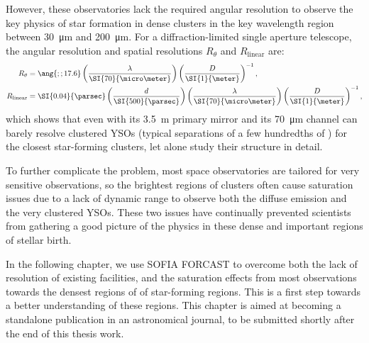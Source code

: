 However, these observatories lack the required angular resolution to observe the key physics of star formation in dense clusters in the key wavelength region between \SI{30}{\micro\meter} and \SI{200}{\micro\meter}. For a diffraction-limited single aperture telescope, the angular resolution and spatial resolutions $R_\theta$ and $R_\textrm{linear}$ are:
\begin{align}
R_\theta &= \ang{;;17.6}\left(\frac{\lambda}{\SI{70}{\micro\meter}}\right)\left(\frac{D}{\SI{1}{\meter}}\right)^{-1}, \\
R_\textrm{linear} &= \SI{0.04}{\parsec}\left(\frac{d}{\SI{500}{\parsec}}\right)\left(\frac{\lambda}{\SI{70}{\micro\meter}}\right)\left(\frac{D}{\SI{1}{\meter}}\right)^{-1},
\end{align}
which shows that even \Herschel with its \SI{3.5}{\meter} primary mirror and its \SI{70}{\micro\meter} channel can barely resolve clustered YSOs (typical separations of a few hundredths of \si{\parsec}) for the closest star-forming clusters, let alone study their structure in detail. 

To further complicate the problem, most space observatories are tailored for very sensitive observations, so the brightest regions of clusters often cause saturation issues due to a lack of dynamic range to observe both the diffuse emission and the very clustered YSOs. These two issues have continually prevented scientists from gathering a good picture of the physics in these dense and important regions of stellar birth.

In the following chapter, we use SOFIA FORCAST to overcome both the lack of resolution of existing facilities, and the saturation effects from most observations towards the densest regions of of star-forming regions. This is a first step towards a better understanding of these regions. This chapter is aimed at becoming a standalone publication in an astronomical journal, to be submitted shortly after the end of this thesis work.


